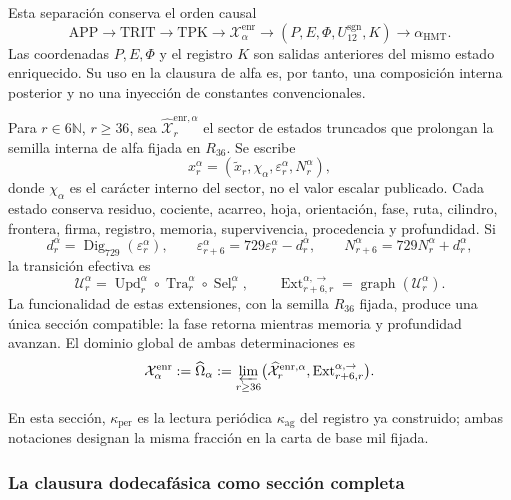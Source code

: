 Esta separación conserva el orden causal
\[
 \mathrm{APP}\longrightarrow\mathrm{TRIT}\longrightarrow\mathrm{TPK}
 \longrightarrow\mathcal X_{\alpha}^{\mathrm{enr}}
 \longrightarrow (P,E,\Phi,U_{12}^{\mathrm{sgn}},K)
 \longrightarrow\alpha_{\mathrm{HMT}}.
\]
Las coordenadas \(P,E,\Phi\) y el registro \(K\) son salidas anteriores del
mismo estado enriquecido. Su uso en la clausura de alfa es, por tanto, una
composición interna posterior y no una inyección de constantes
convencionales.

Para \(r\in6\mathbb N\), \(r\ge36\), sea
\(\widehat{\mathcal X}^{\mathrm{enr},\alpha}_r\) el sector de estados
truncados que prolongan la semilla interna de alfa fijada en \(R_{36}\). Se
escribe
\[
 x_r^\alpha=(\widetilde x_r,\chi_\alpha,
              \varepsilon_r^\alpha,N_r^\alpha),
\]
donde \(\chi_\alpha\) es el carácter interno del sector, no el valor escalar
publicado. Cada estado conserva residuo, cociente, acarreo, hoja, orientación,
fase, ruta, cilindro, frontera, firma, registro, memoria, supervivencia,
procedencia y profundidad. Si
\[
 d_r^\alpha=\operatorname{Dig}_{729}(\varepsilon_r^\alpha),\qquad
 \varepsilon_{r+6}^\alpha=729\varepsilon_r^\alpha-d_r^\alpha,
 \qquad N_{r+6}^\alpha=729N_r^\alpha+d_r^\alpha,
\]
la transición efectiva es
\[
 \mathcal U_r^\alpha=
 \operatorname{Upd}_r^\alpha\circ
 \operatorname{Tra}_r^\alpha\circ
 \operatorname{Sel}_r^\alpha,
 \qquad
 \operatorname{Ext}^{\alpha,\to}_{r+6,r}
 =\operatorname{graph}(\mathcal U_r^\alpha).
\]
La funcionalidad de estas extensiones, con la semilla \(R_{36}\) fijada,
produce una única sección compatible: la fase retorna mientras memoria y
profundidad avanzan. El dominio global de ambas determinaciones es
\begin{equation}
 \mathcal X_\alpha^{\mathrm{enr}}:=\widehat\Omega_\alpha
 :=\varprojlim_{r\ge36}
 \bigl(\widehat{\mathcal X}^{\mathrm{enr},\alpha}_r,
       \operatorname{Ext}^{\alpha,\to}_{r+6,r}\bigr).
 \label{x_reciprocidad:eq:alpha-dominio-enriquecido-completo}
\end{equation}

En esta sección, \(\kappa_{\mathrm{per}}\) es la lectura periódica \(\kappa_{\mathrm{ag}}\) del registro ya construido; ambas notaciones designan la misma fracción en la carta de base mil fijada.

\subsubsection{La clausura dodecafásica como sección completa}

